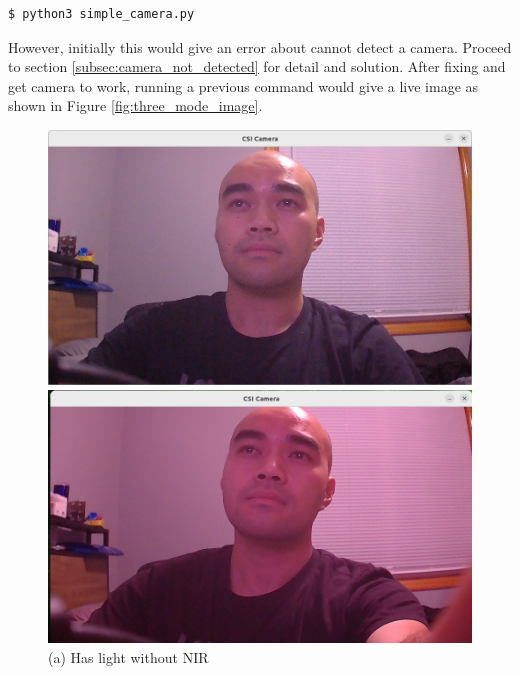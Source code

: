 \documentclass[12pt,hidelinks]{article}
\begin{document}
        \vspace{2mm}

        \begin{lstlisting}[style=bashstyle]
$ python3 simple_camera.py
        \end{lstlisting}

        However, initially this would give an error about cannot detect a camera. Proceed to section \ref{subsec:camera_not_detected} for detail and solution. After fixing and get camera to work, running a previous command would give a live image as shown in Figure \ref{fig:three_mode_image}.

        \begin{figure}[h]
            \centering
    
            \begin{minipage}{0.32\textwidth}
                \centering
                \includegraphics[width=\linewidth]{pics/light_normal.png}
                \caption*{(a) Has light without NIR}
            \end{minipage}\hfill
            \begin{minipage}{0.32\textwidth}
                \centering
                \includegraphics[width=\linewidth]{pics/light_IRCUT.png}

\end{minipage}
\end{figure}
\end{document}
